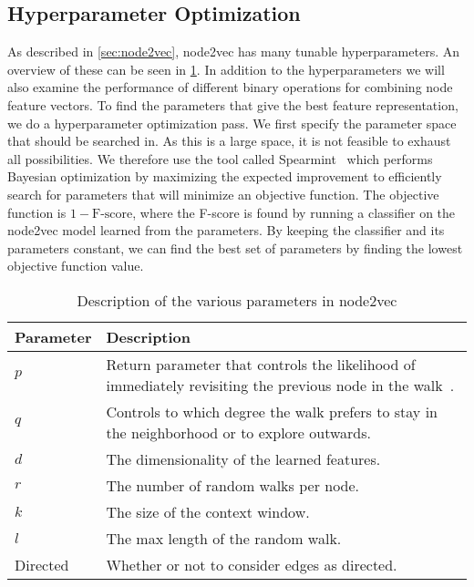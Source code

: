 \subsection{Hyperparameter Optimization}\label{sec:hyperopt}
As described in \cref{sec:node2vec}, node2vec has many tunable hyperparameters. An overview of these can be seen in \cref{tab:node2vecparams}. In addition to the hyperparameters we will also examine the performance of different binary operations for combining node feature vectors. To find the parameters that give the best feature representation, we do a hyperparameter optimization pass. We first specify the parameter space that should be searched in. As this is a large space, it is not feasible to exhaust all possibilities. We therefore use the tool called Spearmint~\cite{snoek2012practical} which performs Bayesian optimization by maximizing the expected improvement to efficiently search for parameters that will minimize an objective function. The objective function is $1 - \text{F-score}$, where the F-score is found by running a classifier on the node2vec model learned from the parameters. By keeping the classifier and its parameters constant, we can find the best set of parameters by finding the lowest objective function value.

\begin{table}[tbp]
\centering
\begin{tabular}{@{}lp{}@{}}
\toprule
\textbf{Parameter} & \textbf{Description} \\
\midrule
$p$          &   Return parameter that controls the likelihood of immediately revisiting the previous node in the walk~\cite{node2vec}.   \\
$q$          &   Controls to which degree the walk prefers to stay in the neighborhood or to explore outwards.   \\
$d$          &   The dimensionality of the learned features.   \\
$r$          &   The number of random walks per node.   \\
$k$          &   The size of the context window.   \\
$l$          &   The max length of the random walk.   \\
Directed     &   Whether or not to consider edges as directed.   \\
\bottomrule
\end{tabular}
\caption[Description of parameters in node2vec]{Description of the various parameters in node2vec}%
\label{tab:node2vecparams}
\end{table}

